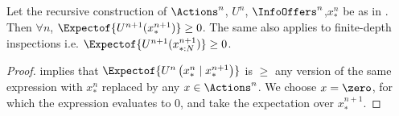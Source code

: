 \begin{subappendices}
\begin{lemma}
Let the recursive construction of $\Actions^n$, $U^n$, $\InfoOffers^n$,$x_*^n$ be as in . Then $\forall n$, $\Expectof{U^{n+1}(x^{n+1}_*)}\ge 0$. The same also applies to finite-depth inspections i.e. $\Expectof{U^{n+1}(x^{n+1}_{*:N})}\ge 0$.
\label{infonomy:lem:voins}
\end{lemma}
\begin{proof}
 implies that $\Expectof{U^n\left(x^n_*\mid x^{n+1}_*\right)}$ is $\ge$ any version of the same expression with $x^n_*$ replaced by any $x\in\Actions^n$. We choose $x=\zero$, for which the expression evaluates to 0, and take the expectation over $x^{n+1}_*$.
\end{proof}



\end{subappendices}
